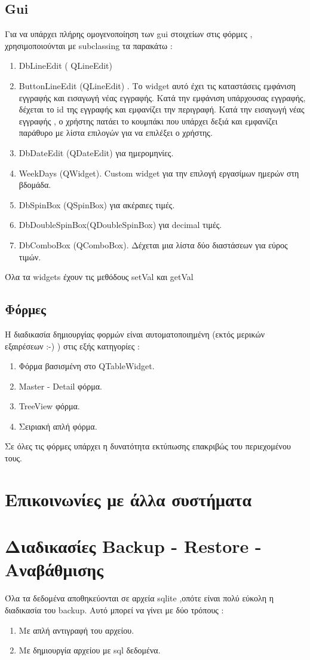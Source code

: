 \documentclass[A4,10pt,greek]{book}
\begin{document}
\subsection{Gui}
Για να υπάρχει πλήρης ομογενοποίηση των gui στοιχείων στις φόρμες , χρησιμοποιούνται με subclassing τα παρακάτω :
\begin{enumerate}
\item DbLineEdit ( QLineEdit)
\item ButtonLineEdit (QLineEdit) . Το widget αυτό έχει τις καταστάσεις  εμφάνιση εγγραφής και εισαγωγή νέας εγγραφής. Κατά την εμφάνιση υπάρχουσας εγγραφής, δέχεται το id της εγγραφής και εμφανίζει την περιγραφή. Κατά την εισαγωγή νέας εγγραφής , ο χρήστης πατάει το κουμπάκι που υπάρχει δεξιά και εμφανίζει παράθυρο με λίστα επιλογών για να επιλέξει ο χρήστης. 
\item DbDateEdit (QDateEdit) για ημερομηνίες.  
\item WeekDays (QWidget). Custom widget για την επιλογή εργασίμων ημερών στη βδομάδα.
\item DbSpinBox (QSpinBox) για ακέραιες τιμές.
\item DbDoubleSpinBox(QDoubleSpinBox) για decimal τιμές.
\item DbComboBox (QComboBox). Δέχεται μια λίστα δύο διαστάσεων για εύρος τιμών.
\end{enumerate}
Όλα τα widgets έχουν τις μεθόδους setVal και getVal
\subsection{Φόρμες}
Η διαδικασία δημιουργίας φορμών είναι αυτοματοποιημένη (εκτός μερικών εξαιρέσεων :-) ) στις εξής κατηγορίες :
\begin{enumerate}
\item Φόρμα βασισμένη στο QTableWidget.
\item Master - Detail φόρμα.
\item TreeView φόρμα.
\item Σειριακή απλή φόρμα.
\end{enumerate}
Σε όλες τις φόρμες υπάρχει η δυνατότητα εκτύπωσης επακριβώς του περιεχομένου τους.
\section{Επικοινωνίες με άλλα συστήματα}
\section{Διαδικασίες Backup - Restore - Αναβάθμισης}
Όλα τα δεδομένα αποθηκεύονται σε αρχεία sqlite ,οπότε είναι πολύ εύκολη η διαδικασία του backup. Αυτό μπορεί να γίνει με δύο τρόπους :
\begin{enumerate}
\item Με απλή αντιγραφή του αρχείου.
\item Με δημιουργία αρχείου με sql δεδομένα.
\end{enumerate}
\end{document}
